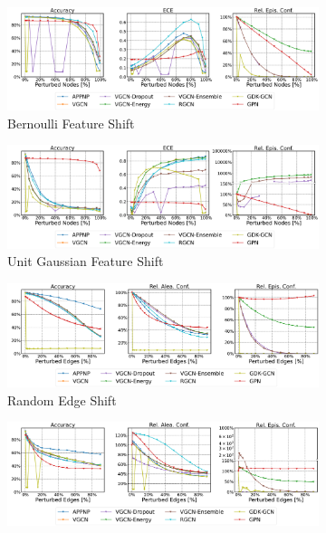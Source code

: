 \begin{figure}
    \centering
    \begin{subfigure}{\textwidth}
        \includegraphics[width=\textwidth]{resources/plots/CoauthorCS-bernoulli-shift.pdf}
        \caption{Bernoulli Feature Shift}
    \end{subfigure}
    \begin{subfigure}{\textwidth}
        \includegraphics[width=\textwidth]{resources/plots/CoauthorCS-normal-shift.pdf}
        \caption{Unit Gaussian Feature Shift}
    \end{subfigure}
    \begin{subfigure}{\textwidth}
        \includegraphics[width=\textwidth]{resources/plots/CoauthorCS-random-shift.pdf}
        \caption{Random Edge Shift}
    \end{subfigure}
    \begin{subfigure}{\textwidth}
        \includegraphics[width=\textwidth]{resources/plots/CoauthorCS-dice-shift.pdf}

\end{subfigure}
\end{figure}
